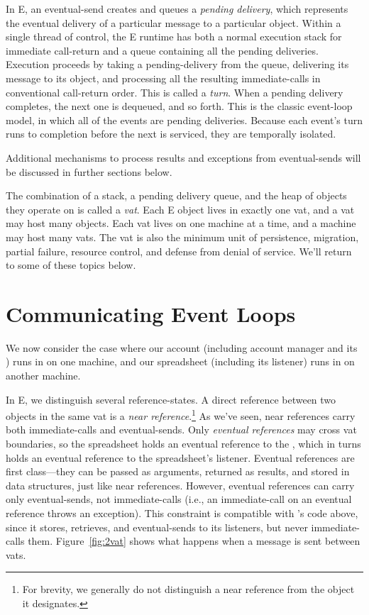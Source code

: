 \documentclass{llncs}
\begin{document}
In E, an eventual-send creates and queues a \emph{pending delivery},
which represents the eventual delivery of a particular message to a
particular object.  Within a single thread of control, the E runtime
has both a normal execution stack for immediate call-return and a
queue containing all the pending deliveries.  Execution proceeds by
taking a pending-delivery from the queue, delivering its message to
its object, and processing all the resulting immediate-calls in
conventional call-return order.  This is called a \emph{turn}.  When a
pending delivery completes, the next one is dequeued, and so forth.
This is the classic event-loop model, in which all of the events are
pending deliveries. Because each event's turn runs to completion
before the next is serviced, they are temporally isolated.

Additional mechanisms to process results and exceptions from
eventual-sends will be discussed in further sections below.

The combination of a stack, a pending delivery queue, and the heap of
objects they operate on is called a \emph{vat}.  Each E object lives
in exactly one vat, and a vat may host many objects.  Each vat lives
on one machine at a time, and a machine may host many vats. The vat is
also the minimum unit of persistence, migration, partial failure,
resource control, and defense from denial of service. We'll return to
some of these topics below.

\section{Communicating Event Loops}

We now consider the case where our account (including account manager
and its ) runs in  on one machine, and our
spreadsheet (including its listener) runs in  on another
machine.

In E, we distinguish several reference-states. A direct reference
between two objects in the same vat is a \emph{near
reference}.\footnote{
%
For brevity, we generally do not distinguish a near reference from the
object it designates.}
%
As we've seen, near references carry both immediate-calls and
eventual-sends. Only \emph{eventual references} may cross vat
boundaries, so the spreadsheet holds an eventual reference to the
, which in turns holds an eventual reference to the
spreadsheet's listener. Eventual references are first class---they can
be passed as arguments, returned as results, and stored in data
structures, just like near references. However, eventual references
can carry only eventual-sends, not immediate-calls (i.e., an
immediate-call on an eventual reference throws an exception). This
constraint is compatible with 's code above, since
it stores, retrieves, and eventual-sends to its listeners, but never
immediate-calls them.  Figure~\ref{fig:2vat} shows what happens when a
message is sent between vats.
\end{document}
